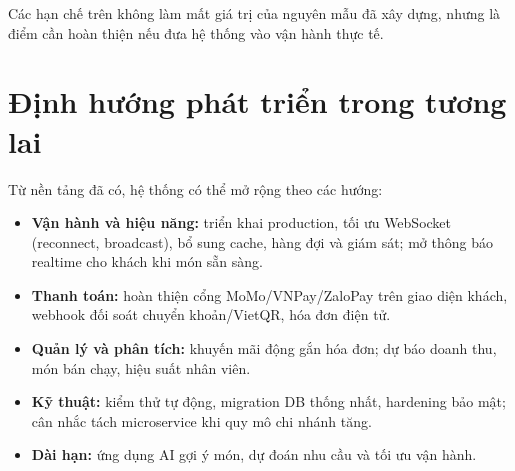 \documentclass[../DoAn.tex]{subfiles}
\begin{document}
Các hạn chế trên không làm mất giá trị của nguyên mẫu đã xây dựng, nhưng là điểm cần hoàn thiện nếu đưa hệ thống vào vận hành thực tế.

\section{Định hướng phát triển trong tương lai}
\label{section:5.3}

Từ nền tảng đã có, hệ thống có thể mở rộng theo các hướng:

\begin{itemize}
    \item \textbf{Vận hành và hiệu năng:} triển khai production, tối ưu WebSocket (reconnect, broadcast), bổ sung cache, hàng đợi và giám sát; mở thông báo realtime cho khách khi món sẵn sàng.
    \item \textbf{Thanh toán:} hoàn thiện cổng MoMo/VNPay/ZaloPay trên giao diện khách, webhook đối soát chuyển khoản/VietQR, hóa đơn điện tử.
    \item \textbf{Quản lý và phân tích:} khuyến mãi động gắn hóa đơn; dự báo doanh thu, món bán chạy, hiệu suất nhân viên.
    \item \textbf{Kỹ thuật:} kiểm thử tự động, migration DB thống nhất, hardening bảo mật; cân nhắc tách microservice khi quy mô chi nhánh tăng.
    \item \textbf{Dài hạn:} ứng dụng AI gợi ý món, dự đoán nhu cầu và tối ưu vận hành.
\end{itemize}
\end{document}
